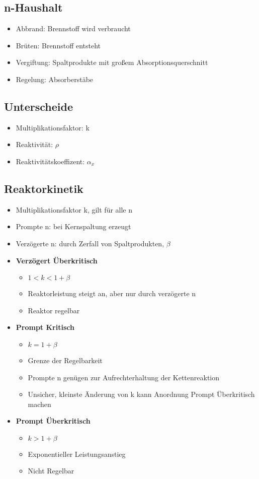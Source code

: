\documentclass[12pt]{article}
\begin{document}
\subsection{n-Haushalt}
\begin{itemize}[noitemsep]
	\item Abbrand: Brennstoff wird verbraucht
	\item Brüten: Brennstoff entsteht
	\item Vergiftung: Spaltprodukte mit großem Absorptionsquerschnitt
	\item Regelung: Absorberstäbe
\end{itemize}

\subsection{Unterscheide}
\begin{itemize}[noitemsep]
	\item Multiplikationsfaktor: k
	\item Reaktivität: \(\rho\)
	\item Reaktivitätskoeffizent: \(\alpha_x\)
\end{itemize}

\subsection{Reaktorkinetik}
\begin{itemize}[noitemsep]
	\item Multiplikationsfaktor k, gilt für alle n
	\item Prompte n: bei Kernspaltung erzeugt
	\item Verzögerte n: durch Zerfall von Spaltprodukten, \(\beta\)
	\item \textbf{Verzögert Überkritisch}
		\begin{itemize}[noitemsep]
			\item \(1 < k < 1 + \beta\)
			\item Reaktorleistung steigt an, aber nur durch verzögerte n
			\item Reaktor regelbar
		\end{itemize}
	\item \textbf{Prompt Kritisch}
		\begin{itemize}[noitemsep]
			\item \(k = 1 + \beta\)
			\item Grenze der Regelbarkeit
			\item Prompte n genügen zur Aufrechterhaltung der Kettenreaktion
			\item Unsicher, kleinste Änderung von k kann Anordnung Prompt Überkritisch machen
		\end{itemize}
	\item \textbf{Prompt Überkritisch}
		\begin{itemize}[noitemsep]
			\item \(k > 1 + \beta\)
			\item Exponentieller Leistungsanstieg
			\item Nicht Regelbar
		\end{itemize}
\end{itemize}
\end{document}
